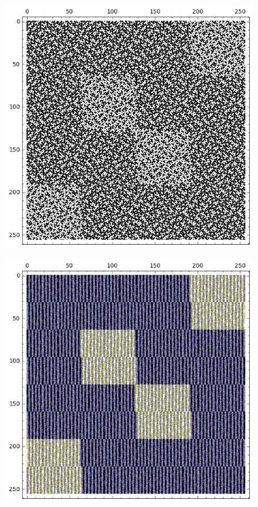 \documentclass[12pt,a4paper]{article}
\begin{document}
\begin{figure}[!bhpt] %
\centering
\begin{minipage}{.48\textwidth}
  \centering
  \includegraphics[width=.9\linewidth]{../matrix_plot/re8_4_weight_class_matrix.png}
  \label{fig:8_4_weight_class_matrix}
\end{minipage}%
\begin{minipage}{.48\textwidth}
  \centering
  \includegraphics[width=.9\linewidth]{../matrix_plot/re8_4_bent_cayley_graph_index_matrix.png}
  \label{fig:8_4_bent_cayley_graph_index_matrix}
\end{minipage}
\end{figure}
~
\end{document}
